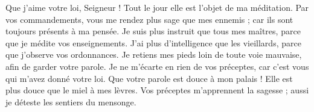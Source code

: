 Que j’aime votre loi, Seigneur ! Tout le jour elle est l’objet de ma méditation.
\versseparator
Par vos commandements, vous me rendez plus sage que mes ennemis ; car ils sont toujours présents à ma pensée.
\versseparator
Je suis plus instruit que tous mes maîtres, parce que je médite vos enseignements.
\versseparator
J’ai plus d’intelligence que les vieillards, parce que j’observe vos ordonnances.
\versseparator
Je retiens mes pieds loin de toute voie mauvaise, afin de garder votre parole.
\versseparator
Je ne m’écarte en rien de vos préceptes, car c’est vous qui m’avez donné votre loi.
\versseparator
Que votre parole est douce à mon palais ! Elle est plus douce que le miel à mes lèvres.
\versseparator
Vos préceptes m’apprennent la sagesse ; aussi je déteste les sentiers du mensonge.